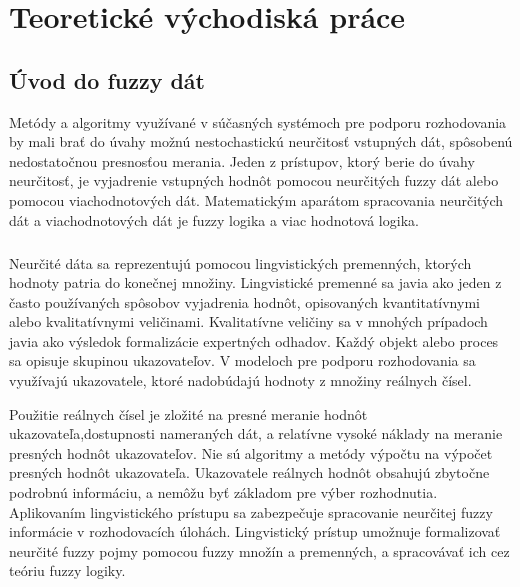 \chapter{Teoretické východiská práce} 

\section{Úvod do fuzzy dát}
Metódy a algoritmy využívané v súčasných systémoch pre podporu rozhodovania by mali brať do úvahy možnú nestochastickú neurčitosť vstupných dát, spôsobenú nedostatočnou presnosťou merania. Jeden z prístupov, ktorý berie do úvahy neurčitosť, je vyjadrenie vstupných hodnôt pomocou neurčitých fuzzy dát alebo pomocou viachodnotových dát. 
Matematickým aparátom spracovania neurčitých dát a viachodnotových dát je fuzzy logika a viac hodnotová logika. \cite{levashenkoProj}%
\paragraph{}
Neurčité dáta sa reprezentujú pomocou lingvistických premenných, ktorých hodnoty patria do konečnej množiny. 
Lingvistické premenné sa javia ako jeden z často používaných spôsobov vyjadrenia hodnôt, opisovaných kvantitatívnymi 
alebo kvalitatívnymi veličinami. Kvalitatívne veličiny sa v mnohých prípadoch javia ako výsledok formalizácie expertných odhadov. 
Každý objekt alebo proces sa opisuje skupinou ukazovateľov. V modeloch pre podporu rozhodovania sa využívajú ukazovatele, ktoré nadobúdajú hodnoty z množiny reálnych čísel. \cite{levashenkoProj}

Použitie reálnych čísel je zložité na presné meranie hodnôt ukazovateľa,dostupnosti nameraných dát, a relatívne vysoké náklady na meranie presných hodnôt ukazovateľov. Nie sú algoritmy a metódy výpočtu na výpočet presných hodnôt ukazovateľa. Ukazovatele reálnych hodnôt obsahujú zbytočne podrobnú informáciu, a nemôžu byť základom pre výber rozhodnutia. Aplikovaním lingvistického prístupu sa zabezpečuje spracovanie neurčitej fuzzy informácie v rozhodovacích úlohách. Lingvistický prístup umožnuje formalizovať neurčité fuzzy pojmy pomocou fuzzy množín a premenných, a spracovávať ich cez teóriu fuzzy logiky. 



